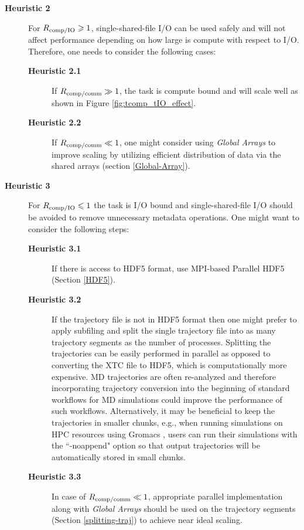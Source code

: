 \begin{description}
\item[\textbf{Heuristic 2}] For $R_{\text{comp/IO}} \geqslant 1$, single-shared-file I/O can be used safely and will not affect performance depending on how large is compute with respect to I/O. Therefore, one needs to consider the following cases: 
  \begin{description}
  \item[\textbf{Heuristic 2.1}] If $R_{\text{comp/comm}} \gg 1$, the task is compute bound and will scale well as shown in Figure \ref{fig:tcomp_tIO_effect}. 
  \item[\textbf{Heuristic 2.2}] If $R_{\text{comp/comm}} \ll 1$, one might consider using \emph{Global Arrays} to improve scaling by utilizing efficient distribution of data via the shared arrays (section \ref{Global-Array}).
  \end{description}
\item[\textbf{Heuristic 3}] For $R_{\text{comp/IO}} \leqslant 1$ the task is I/O bound and single-shared-file I/O should be avoided to remove unnecessary metadata operations.
  One might want to consider the following steps:  
  \begin{description}
    \item[\textbf{Heuristic 3.1}] If there is access to HDF5 format, use MPI-based Parallel HDF5 (Section \ref{HDF5}). 
    \item[\textbf{Heuristic 3.2}] If the trajectory file is not in HDF5 format then one might prefer to apply subfiling and split the single trajectory file into as many trajectory segments as the number of processes.
      Splitting the trajectories can be easily performed in parallel as opposed to converting the XTC file to HDF5, which is computationally more expensive.
      MD trajectories are often re-analyzed and therefore incorporating trajectory conversion into the beginning of standard workflows for MD simulations could improve the performance of such workflows.
      Alternatively, it may be beneficial to keep the trajectories in smaller chunks, e.g., when running simulations on HPC resources using Gromacs \cite{Abraham:2015aa}, users can run their simulations with the ``-noappend" option so that output trajectories will be automatically stored in small chunks.
    \item[\textbf{Heuristic 3.3}] In case of $R_{\text{comp/comm}} \ll 1$, appropriate parallel implementation along with \emph{Global Arrays} should be used on the trajectory segments (Section \ref{splitting-traj}) to achieve near ideal scaling.
  \end{description}
\end{description}
